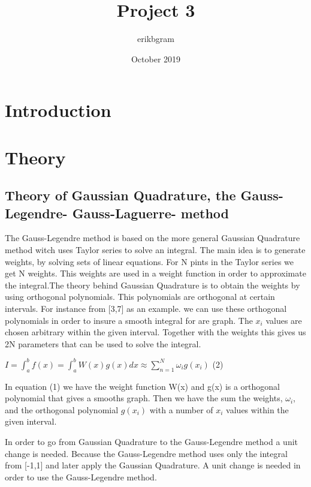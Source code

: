 \documentclass{article}
\title{Project 3}
\author{erikbgram }
\date{October 2019}
\begin{document}
\maketitle

\section{Introduction}
\section{Theory}

\subsection{Theory of Gaussian Quadrature, the Gauss-Legendre- Gauss-Laguerre- method}

The Gauss-Legendre method is based on the more general Gaussian Quadrature method witch uses Taylor series to solve an integral. The main idea is to generate weights, by solving sets of linear equations. For N pints in the Taylor series we get N weights. This weights are used in a weight function in order to approximate the integral.The theory behind Gaussian Quadrature is to obtain the weights by using orthogonal polynomials. This polynomials are orthogonal at certain intervals. For instance from [3,7] as an example. we can use these orthogonal polynomials in order to insure a smooth integral for are graph. The $x_i$ values are chosen arbitrary within the given interval. Together with the weights this gives us 2N parameters that can be used to solve the integral.      
\newline
\newline

$I = \int_{a}^{b} f(x) = \int_{a}^{b}W(x)g(x)dx \approx  \sum_{n=1}^{N}  \omega_i g(x_i) $ (2) 
\newline
\newline

In equation (1) we have the weight function W(x) and g(x) is a orthogonal polynomial that gives a smooths graph. Then we have the sum the weights, $\omega_i$, and the orthogonal polynomial $g(x_i)$ with a number of $x_i$ values within the given interval. 
\newline
\newline

In order to go from Gaussian Quadrature to the Gauss-Legendre method a unit change is needed. Because the Gauss-Legendre method uses only the integral from [-1,1] and later apply the Gaussian Quadrature. A unit change is needed in order to use the Gauss-Legendre method.  
\newline
\newline
\end{document}
